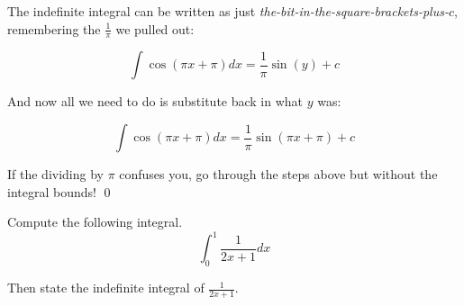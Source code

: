 \begin{solution}
    The indefinite integral can be written as just \emph{the-bit-in-the-square-brackets-plus-$c$}, remembering the $\frac{1}{\pi}$ we pulled out:

    \[ \int  \cos(\pi x + \pi) dx  = \frac{1}{\pi}\sin(y) + c \]

    And now all we need to do is substitute back in what $y$ was:

    \[ \int \cos(\pi x + \pi) dx= \frac{1}{\pi}\sin(\pi x + \pi) + c \]

    If the dividing by $\pi$ confuses you, go through the steps above but without the integral bounds!
    \qed
\end{solution}


\begin{example}
    Compute the following integral.
    \[ \int_{0}^{1} \frac{1}{2x + 1} dx \]

    Then state the indefinite integral of $\frac{1}{2x + 1}$.
\end{example}

